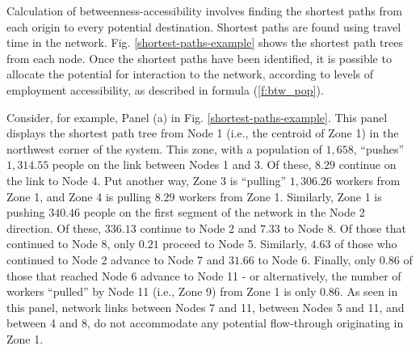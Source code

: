 \documentclass[]{elsarticle} %
\begin{document}
Calculation of betweenness-accessibility involves finding the shortest
paths from each origin to every potential destination. Shortest paths
are found using travel time in the network. Fig.
\ref{shortest-paths-example} shows the shortest path trees from each
node. Once the shortest paths have been identified, it is possible to
allocate the potential for interaction to the network, according to
levels of employment accessibility, as described in formula
(\ref{f:btw_pop}).

Consider, for example, Panel (a) in Fig. \ref{shortest-paths-example}.
This panel displays the shortest path tree from Node 1 (i.e., the
centroid of Zone 1) in the northwest corner of the system. This zone,
with a population of \(1,658\), ``pushes'' \(1,314.55\) people on the
link between Nodes 1 and 3. Of these, \(8.29\) continue on the link to
Node 4. Put another way, Zone 3 is ``pulling'' \(1,306.26\) workers from
Zone 1, and Zone 4 is pulling \(8.29\) workers from Zone 1. Similarly,
Zone 1 is pushing \(340.46\) people on the first segment of the network
in the Node 2 direction. Of these, \(336.13\) continue to Node 2 and
\(7.33\) to Node 8. Of those that continued to Node 8, only \(0.21\)
proceed to Node 5. Similarly, \(4.63\) of those who continued to Node 2
advance to Node 7 and \(31.66\) to Node 6. Finally, only \(0.86\) of
those that reached Node 6 advance to Node 11 - or alternatively, the
number of workers ``pulled'' by Node 11 (i.e., Zone 9) from Zone 1 is
only \(0.86\). As seen in this panel, network links between Nodes 7 and
11, between Nodes 5 and 11, and between 4 and 8, do not accommodate any
potential flow-through originating in Zone 1.
\end{document}
